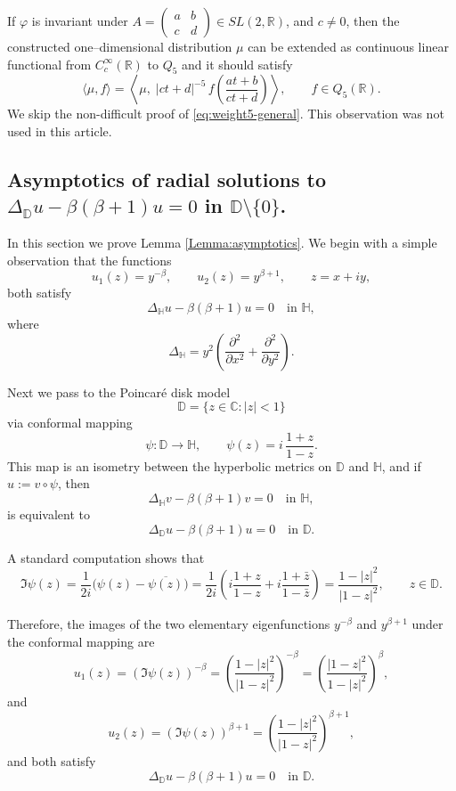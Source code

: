 \documentclass{article}
\newcommand{\R}{\mathbb{R}}
\begin{document}
If $\varphi$ is invariant under $A = \begin{pmatrix}a & b\\ c & d\end{pmatrix}\in SL(2,\R)$, and $c\neq0$,
then the constructed one–dimensional distribution $\mu$ can be extended as continuous linear functional from $C_c^\infty(\mathbb{R})$ to $Q_5$ and it should satisfy
\begin{equation}\label{eq:weight5-general}
  \big\langle \mu,f\big\rangle
  = \left\langle \mu,\;
     |ct+d|^{-5}\,
     f\!\left(\frac{at+b}{ct+d}\right)\right\rangle,
  \qquad f\in Q_5(\R). 
\end{equation}
We skip the non-difficult proof of \eqref{eq:weight5-general}. This observation was not used in this article. 

\subsection*{Asymptotics of radial solutions to $\Delta_\mathbb{D} u-\beta(\beta+1) u =0$ in $\mathbb{D}\setminus\{0\}$.}

In this section we prove Lemma \ref{Lemma:asymptotics}.
We begin with a simple observation that the functions
\[
u_1(z) = y^{-\beta}, \qquad u_2(z) = y^{\beta+1}, \qquad z=x+iy,
\]
both satisfy 
\[
\Delta_{\mathbb{H}} u - \beta(\beta+1)u = 0 \quad \text{in } \mathbb{H},
\]
where
\[
\Delta_{\mathbb{H}} = y^{2}\left(\frac{\partial^{2}}{\partial x^{2}}
+ \frac{\partial^{2}}{\partial y^{2}}\right).
\]

Next we pass to the Poincaré disk model
\[
\mathbb{D} = \{z\in\mathbb{C} : |z|<1\}
\]
via conformal mapping
\[
\psi:\mathbb{D}\to\mathbb{H}, \qquad
\psi(z) = i\,\frac{1+z}{1-z}.
\]
This map is an isometry between the hyperbolic metrics on $\mathbb{D}$ and $\mathbb{H}$, and if $u := v\circ\psi$, then
\[
\Delta_{\mathbb{H}} v - \beta(\beta+1)v = 0 \quad\text{in }\mathbb{H},
\]
is equivalent to
\[
\Delta_{\mathbb{D}} u - \beta(\beta+1)u = 0 \quad\text{in }\mathbb{D}.
\]

A standard computation shows that
\[
\Im\psi(z)
= \frac{1}{2i}\bigl(\psi(z)-\overline{\psi(z)}\bigr)
= \frac{1}{2i}\left(i\frac{1+z}{1-z} + i\frac{1+\bar z}{1-\bar z}\right)
= \frac{1-|z|^2}{|1-z|^2}, \qquad z\in\mathbb{D}.
\]

Therefore, the images of the two elementary eigenfunctions $y^{-\beta}$ and
$y^{\beta+1}$ under the conformal mapping are
\[
u_1(z) = (\Im\psi(z))^{-\beta}
= \left(\frac{1-|z|^2}{|1-z|^2}\right)^{-\beta}
= \left(\frac{|1-z|^2}{1-|z|^2}\right)^{\beta},
\]
and
\[
u_2(z) = (\Im\psi(z))^{\beta+1}
= \left(\frac{1-|z|^2}{|1-z|^2}\right)^{\beta+1},
\]
and both satisfy
\[
\Delta_{\mathbb{D}} u - \beta(\beta+1)u = 0 \quad\text{in }\mathbb{D}.
\]
\end{document}
